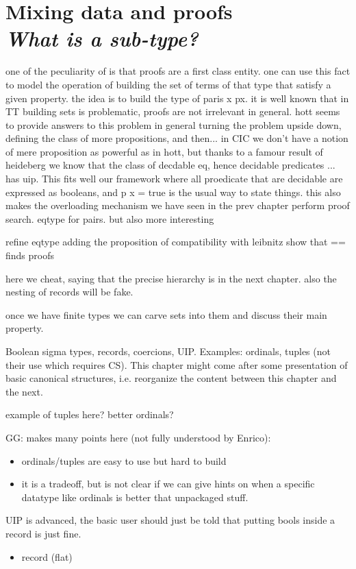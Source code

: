 \chapter[Mixing data and proofs]{Mixing data and proofs\\[2ex]\Large\itshape What is a sub-type?}

one of the peculiarity of \mcbCIC{} is that proofs are a first
class entity.  one can use this fact to model the operation of building
the set of terms of that type that satisfy a given property.
the idea is to build the type of paris x px.
it is well known that in TT building sets is problematic,
proofs are not irrelevant in general.
hott seems to provide answers to this problem in general
turning the problem upside down, defining the class of more
propositions, and then...
in CIC we don't have a notion of mere proposition as powerful
as in hott, but thanks to a famour result of heideberg
we know that the class of decdable eq, hence decidable predicates
... has uip.  This fits well our framework where all proedicate that
are decidable are expressed as booleans, and p x = true is
the usual way to state things.
this also makes the overloading mechanism we have seen in the prev
chapter perform proof search. eqtype for pairs. but also more
interesting


refine eqtype adding the proposition of compatibility with leibnitz
show that == finds proofs


here we cheat, saying that the precise hierarchy is in the next
chapter.  also the nesting of records will be fake.


once we have finite types we can carve sets into them and
discuss their main property.



Boolean sigma types, records, coercions, UIP. Examples: ordinals,
tuples (not their use which requires CS). This chapter might come
after some presentation of basic canonical structures, i.e. reorganize
the content between this chapter and the next.

example of tuples here? better ordinals?

GG: makes many points here (not fully understood by Enrico):
\begin{itemize}
\item ordinals/tuples are easy to use but hard to build
\item it is a tradeoff, but is not clear if we can give hints on when
	a specific datatype like ordinals is better that unpackaged
	stuff.
\end{itemize}

UIP is advanced, the basic user should just be told that putting
bools inside a record is just fine.

\begin{itemize}
	\item record (flat)
	
\end{itemize}


